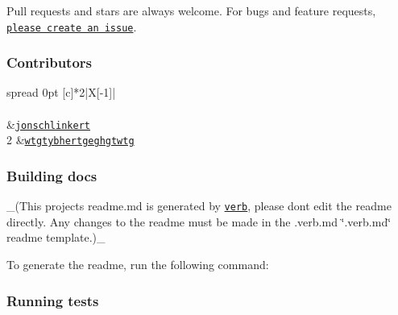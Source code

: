 {\ttfamily }

{\ttfamily Pull requests and stars are always welcome. For bugs and feature requests, \href{../../issues/new}{\tt please create an issue}.}

{\ttfamily \subsubsection*{Contributors}}

{\ttfamily }

{\ttfamily \tabulinesep=1mm
\begin{longtabu} spread 0pt [c]{*{2}{|X[-1]}|}
\hline
\rowcolor{\tableheadbgcolor}\\
\endfirsthead
\hline
\endfoot
\hline
\rowcolor{\tableheadbgcolor}\\
  &\href{https://github.com/jonschlinkert}{\tt jonschlinkert}   \\
2  &\href{https://github.com/wtgtybhertgeghgtwtg}{\tt wtgtybhertgeghgtwtg}   \\
\end{longtabu}
}

{\ttfamily \subsubsection*{Building docs}}

{\ttfamily }

{\ttfamily \+\_\+(This project\textquotesingle{}s readme.\+md is generated by \href{https://github.com/verbose/verb-generate-readme}{\tt verb}, please don\textquotesingle{}t edit the readme directly. Any changes to the readme must be made in the .verb.\+md \char`\"{}.\+verb.\+md\char`\"{} readme template.)\+\_\+}

{\ttfamily To generate the readme, run the following command\+:}

{\ttfamily 
{}
}

{\ttfamily \subsubsection*{Running tests}}

